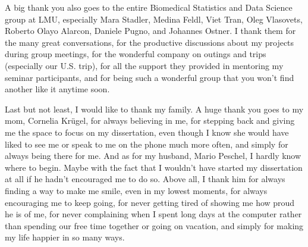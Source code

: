 A big thank you also goes to the entire Biomedical Statistics and Data Science group at LMU, especially Mara Stadler, Medina Feldl, Viet Tran, Oleg Vlasovets, Roberto Olayo Alarcon, Daniele Pugno, and Johannes Ostner. I thank them for the many great conversations, for the productive discussions about my projects during group meetings, for the wonderful company on outings and trips (especially our U.S. trip), for all the support they provided in mentoring my seminar participants, and for being such a wonderful group that you won't find another like it anytime soon.

Last but not least, I would like to thank my family. A huge thank you goes to my mom, Cornelia Krügel, for always believing in me, for stepping back and giving me the space to focus on my dissertation, even though I know she would have liked to see me or speak to me on the phone much more often, and simply for always being there for me. And as for my husband, Mario Peschel, I hardly know where to begin. Maybe with the fact that I wouldn't have started my dissertation at all if he hadn't encouraged me to do so. Above all, I thank him for always finding a way to make me smile, even in my lowest moments, for always encouraging me to keep going, for never getting tired of showing me how proud he is of me, for never complaining when I spent long days at the computer rather than spending our free time together or going on vacation, and simply for making my life happier in so many ways.

\cleardoublepage